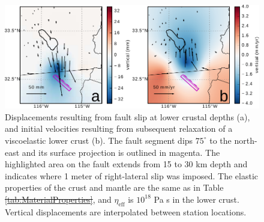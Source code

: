 \documentclass[draft,linenumbers]{AGUJournal}
\providecommand{\DIFadd}[1]{{\protect\color{blue}\uwave{#1}}} %
\providecommand{\DIFdel}[1]{{\protect\color{red}\sout{#1}}}                      %
\providecommand{\DIFaddFL}[1]{\DIFadd{#1}} %
\providecommand{\DIFdelFL}[1]{\DIFdel{#1}} %
\providecommand{\DIFaddbeginFL}{} %
\providecommand{\DIFaddendFL}{} %
\providecommand{\DIFdelbeginFL}{} %
\providecommand{\DIFdelendFL}{} %
\begin{document}
\begin{figure}
\DIFdelbeginFL %
\DIFdelendFL \DIFaddbeginFL \includegraphics[scale=0.9]{Figures/2016jb013114-p09}
\DIFaddendFL \caption{Displacements resulting from fault slip at lower crustal depths (a), and initial velocities resulting from subsequent relaxation of a viscoelastic lower crust (b).  The fault segment dips $75^\circ$ to the north-east and its surface projection is outlined in magenta.  The highlighted area on the fault extends from 15 to 30 km depth and indicates where 1 meter of right-lateral slip was imposed.  The elastic properties of the crust and mantle are the same as in Table \DIFdelbeginFL \DIFdelFL{\ref{tab:MaterialProperties}}\DIFdelendFL \DIFaddbeginFL \DIFaddFL{1}\DIFaddendFL , and $\eta_\mathrm{eff}$  is $10^{18}$ Pa s in the lower crust.  Vertical displacements are interpolated between station locations.}
\label{fig:LowerCrust}
\end{figure}
\end{document}
